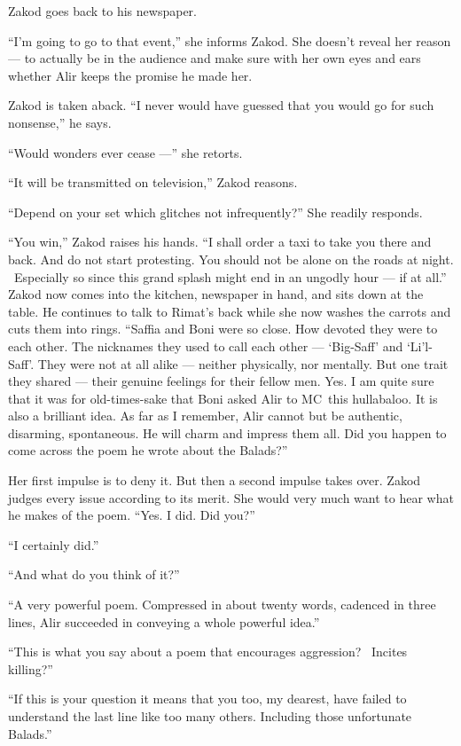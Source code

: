 \documentclass[twoside,11pt,openany]{book}
\begin{document}
Zakod goes back to his newspaper.

``I'm going to go to that event,'' she informs Zakod. She doesn't reveal her reason --- to
actually be in the audience and make sure with her own eyes and ears whether Alir keeps  the promise he made
her.{ }

Zakod is taken aback. ``I never would have guessed that you would go for such nonsense,'' he says.

``Would wonders ever cease ---'' she retorts.

``It will be transmitted on television,'' Zakod reasons.

``Depend on your set which glitches not infrequently?'' She readily responds.

``You win,'' Zakod raises his hands. ``I shall order a taxi to take you there and
back. And do not start protesting. You should not be alone on the roads at night. ~Especially so since this grand
splash might end in an ungodly hour --- if at all.'' Zakod now comes into the kitchen, newspaper in hand,
and sits down at the table. He continues to talk to Rimat's back while she now washes the carrots and cuts them into
rings. ``Saffia and Boni were so close.  How devoted they were to each other{.}  The
nicknames they used to call each other --- `Big-Saff' and `Li'l-Saff'. They were not at all alike --- neither physically,
nor mentally. But one trait they shared --- their genuine feelings for their
fellow men. Yes. I am quite sure that it was for old-times-sake that Boni asked Alir to MC~this hullabaloo. It is
also a brilliant idea. As far as I remember, Alir cannot but be authentic, disarming, spontaneous. He will charm and
impress them all. Did you happen to come across the poem he wrote about the Balads?''

Her first impulse is to deny it. But then a second impulse takes over. Zakod judges every issue according to its merit.
She would very much want to hear what he makes of the poem. ``Yes. I did. Did you?''

``I certainly did.''

``And what do you think of it?''

``A very powerful poem. Compressed in about twenty words, cadenced in three lines, Alir succeeded in
conveying a whole powerful idea.''

``This is what you say about a poem that encourages aggression? ~Incites killing?''

``If this is your question it means that you too, my dearest, have failed to understand the last line like
too many others. Including those unfortunate Balads.''
\end{document}
